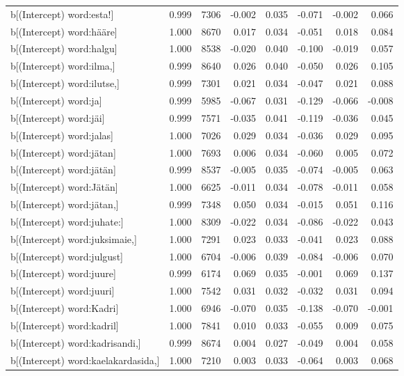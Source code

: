\begin{longtable}{lrrrrrrr}
  b[(Intercept) word:esta!] & 0.999 & 7306 & -0.002 & 0.035 & -0.071 & -0.002 & 0.066 \\ 
  b[(Intercept) word:hääre] & 1.000 & 8670 & 0.017 & 0.034 & -0.051 & 0.018 & 0.084 \\ 
  b[(Intercept) word:halgu] & 1.000 & 8538 & -0.020 & 0.040 & -0.100 & -0.019 & 0.057 \\ 
  b[(Intercept) word:ilma,] & 0.999 & 8640 & 0.026 & 0.040 & -0.050 & 0.026 & 0.105 \\ 
  b[(Intercept) word:ilutse,] & 0.999 & 7301 & 0.021 & 0.034 & -0.047 & 0.021 & 0.088 \\ 
  b[(Intercept) word:ja] & 0.999 & 5985 & -0.067 & 0.031 & -0.129 & -0.066 & -0.008 \\ 
  b[(Intercept) word:jäi] & 0.999 & 7571 & -0.035 & 0.041 & -0.119 & -0.036 & 0.045 \\ 
  b[(Intercept) word:jalas] & 1.000 & 7026 & 0.029 & 0.034 & -0.036 & 0.029 & 0.095 \\ 
  b[(Intercept) word:jätan] & 1.000 & 7693 & 0.006 & 0.034 & -0.060 & 0.005 & 0.072 \\ 
  b[(Intercept) word:jätän] & 0.999 & 8537 & -0.005 & 0.035 & -0.074 & -0.005 & 0.063 \\ 
  b[(Intercept) word:Jätän] & 1.000 & 6625 & -0.011 & 0.034 & -0.078 & -0.011 & 0.058 \\ 
  b[(Intercept) word:jätan,] & 0.999 & 7348 & 0.050 & 0.034 & -0.015 & 0.051 & 0.116 \\ 
  b[(Intercept) word:juhate:] & 1.000 & 8309 & -0.022 & 0.034 & -0.086 & -0.022 & 0.043 \\ 
  b[(Intercept) word:juksimaie,] & 1.000 & 7291 & 0.023 & 0.033 & -0.041 & 0.023 & 0.088 \\ 
  b[(Intercept) word:julgust] & 1.000 & 6704 & -0.006 & 0.039 & -0.084 & -0.006 & 0.070 \\ 
  b[(Intercept) word:juure] & 0.999 & 6174 & 0.069 & 0.035 & -0.001 & 0.069 & 0.137 \\ 
  b[(Intercept) word:juuri] & 1.000 & 7542 & 0.031 & 0.032 & -0.032 & 0.031 & 0.094 \\ 
  b[(Intercept) word:Kadri] & 1.000 & 6946 & -0.070 & 0.035 & -0.138 & -0.070 & -0.001 \\ 
  b[(Intercept) word:kadril] & 1.000 & 7841 & 0.010 & 0.033 & -0.055 & 0.009 & 0.075 \\ 
  b[(Intercept) word:kadrisandi,] & 0.999 & 8674 & 0.004 & 0.027 & -0.049 & 0.004 & 0.058 \\ 
  b[(Intercept) word:kaelakardasida,] & 1.000 & 7210 & 0.003 & 0.033 & -0.064 & 0.003 & 0.068 \\ 

\end{longtable}
